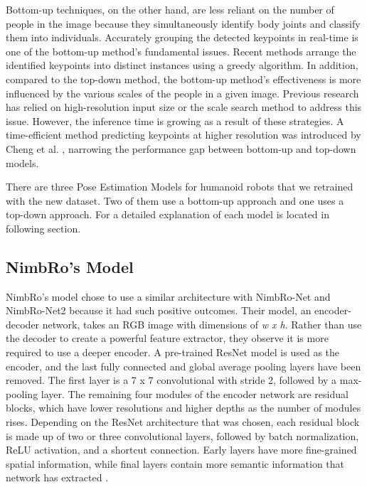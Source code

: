 Bottom-up techniques, on the other hand, are less reliant on the number of people in the image because they simultaneously identify body joints and classify them into individuals. Accurately grouping the detected keypoints in real-time is one of the bottom-up method's fundamental issues.
Recent methods arrange the identified keypoints into distinct instances using a greedy algorithm. In addition, compared to the top-down method, the bottom-up method's effectiveness is more influenced by the various scales of the people in a given image. Previous research has relied on high-resolution input size \parencite{papandreou2018} or the scale search method \parencite{cao2019} to address this issue. However, the inference time is growing as a result of these strategies.
A time-efficient method predicting keypoints at higher resolution was introduced by Cheng et al. \parencite{cheng2020}, narrowing the performance gap between bottom-up and top-down models.

There are three Pose Estimation Models for humanoid robots that we retrained with the
new dataset. Two of them use a bottom-up approach and one uses a top-down approach. For a detailed explanation of each model is located in following section.

\subsection{NimbRo's Model}
\label{subsec:nimbromodel}

NimbRo's model chose to use a similar architecture with NimbRo-Net and NimbRo-Net2 because it had such positive outcomes.
Their model, an encoder-decoder network, takes an RGB image with dimensions of \emph{w x h}. Rather than use the decoder to create a powerful feature extractor, they observe it is more required to use a deeper encoder.
A pre-trained ResNet model \parencite{he2016} is used as the encoder, and the last fully connected and global average pooling layers have been removed.
The first layer is a 7 x 7 convolutional with stride 2, followed by a max-pooling layer.  The remaining four modules of the encoder network are residual blocks, which have lower resolutions and higher depths as the number of modules rises.
Depending on the ResNet architecture that was chosen, each residual block is made up of two or three convolutional layers, followed by batch normalization, ReLU activation, and a shortcut connection. Early layers have more fine-grained spatial information,
while final layers contain more semantic information that network has extracted \parencite{amini2021}.

